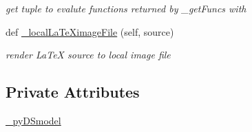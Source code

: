 \begin{DoxyCompactItemize}
\begin{DoxyCompactList}\small\item\em get tuple to evalute functions returned by \+\_\+get\+Funcs with \end{DoxyCompactList}\item 
def \hyperlink{class_mu_mo_t_1_1_mu_mo_tmodel_ad1478cdd69a86f50f84e0528f829573c}{\+\_\+local\+La\+Te\+Ximage\+File} (self, source)
\begin{DoxyCompactList}\small\item\em render La\+TeX source to local image file \end{DoxyCompactList}\end{DoxyCompactItemize}
\subsection*{Private Attributes}
\begin{DoxyCompactItemize}
\item 
\hyperlink{class_mu_mo_t_1_1_mu_mo_tmodel_a9e9a430da6d323cc4411c070e0c7eee5}{\+\_\+py\+D\+Smodel}
\end{DoxyCompactItemize}
